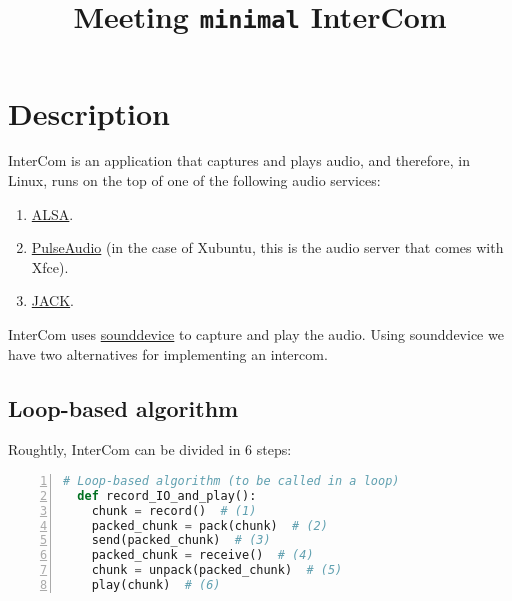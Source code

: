 
\title{Meeting \texttt{minimal} InterCom}

\maketitle

\section{Description}

InterCom is an application that captures and plays audio, and therefore, in Linux, runs on the top of one of the following audio services:
\begin{enumerate}
\item \href{https://vicente-gonzalez-ruiz.github.io/ALSA/}{ALSA}.
\item
  \href{https://vicente-gonzalez-ruiz.github.io/PulseAudio/}{PulseAudio}
  (in the case of Xubuntu, this is the audio server that comes with
  Xfce).
\item \href{https://vicente-gonzalez-ruiz.github.io/JACK/}{JACK}.
\end{enumerate}

InterCom uses
\href{https://vicente-gonzalez-ruiz.github.io/intro_to_sounddevice/}{sounddevice}
to capture and play the audio. Using sounddevice we have two alternatives for implementing an intercom.

\subsection{Loop-based algorithm}

Roughtly, InterCom can be divided in 6 steps:

\begin{lstlisting}[language=Python,numbers=left]
  # Loop-based algorithm (to be called in a loop)
  def record_IO_and_play():
    chunk = record()  # (1)
    packed_chunk = pack(chunk)  # (2)
    send(packed_chunk)  # (3)
    packed_chunk = receive()  # (4)
    chunk = unpack(packed_chunk)  # (5)
    play(chunk)  # (6)
\end{lstlisting}


